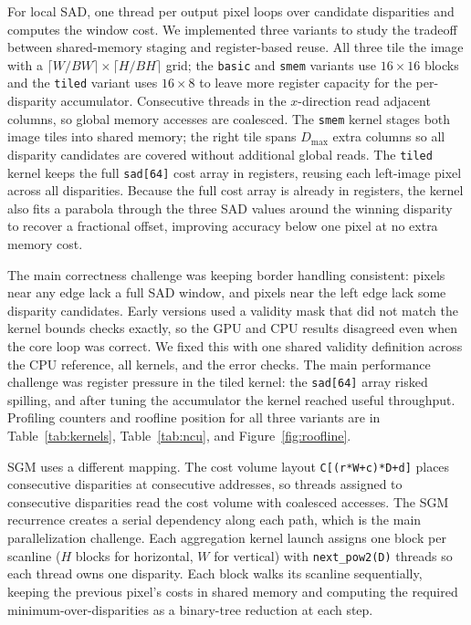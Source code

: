 \documentclass[11pt]{article}
\begin{document}
For local SAD, one thread per output pixel loops over candidate disparities and
computes the window cost. We implemented three variants to study the tradeoff
between shared-memory staging and register-based reuse. All three tile the image with a
$\lceil W/BW\rceil \times \lceil H/BH\rceil$ grid; the \texttt{basic} and
\texttt{smem} variants use $16\times16$ blocks and the \texttt{tiled} variant
uses $16\times8$ to leave more register capacity for the per-disparity
accumulator. Consecutive threads in the $x$-direction read adjacent columns, so
global memory accesses are coalesced. The \texttt{smem} kernel stages both image
tiles into shared memory; the right tile spans $D_{\max}$ extra columns so all
disparity candidates are covered without additional global reads. The
\texttt{tiled} kernel keeps the full \texttt{sad[64]} cost array in registers,
reusing each left-image pixel across all disparities. Because the full cost
array is already in registers, the kernel also fits a parabola through the three
SAD values around the winning disparity to recover a fractional offset, improving
accuracy below one pixel at no extra memory cost.

The main correctness challenge was keeping border handling consistent: pixels
near any edge lack a full SAD window, and pixels near the left edge lack some
disparity candidates. Early versions used a validity mask that did not match the
kernel bounds checks exactly, so the GPU and CPU results disagreed even when the
core loop was correct. We fixed this with one shared validity definition across
the CPU reference, all kernels, and the error checks. The main performance
challenge was register pressure in the tiled kernel: the \texttt{sad[64]} array
risked spilling, and after tuning the accumulator the kernel reached useful
throughput. Profiling counters and roofline position for all three variants are
in Table~\ref{tab:kernels}, Table~\ref{tab:ncu}, and Figure~\ref{fig:roofline}.

SGM uses a different mapping. The cost volume layout \texttt{C[(r*W+c)*D+d]}
places consecutive disparities at consecutive addresses, so threads assigned to
consecutive disparities read the cost volume with coalesced accesses. The SGM
recurrence creates a serial dependency along each path, which is the main parallelization challenge. Each
aggregation kernel launch assigns one block per scanline ($H$ blocks for
horizontal, $W$ for vertical) with \texttt{next\_pow2(D)} threads so each thread
owns one disparity. Each block walks its scanline sequentially, keeping the
previous pixel's costs in shared memory and computing the required
minimum-over-disparities as a binary-tree reduction at each step.
\end{document}
